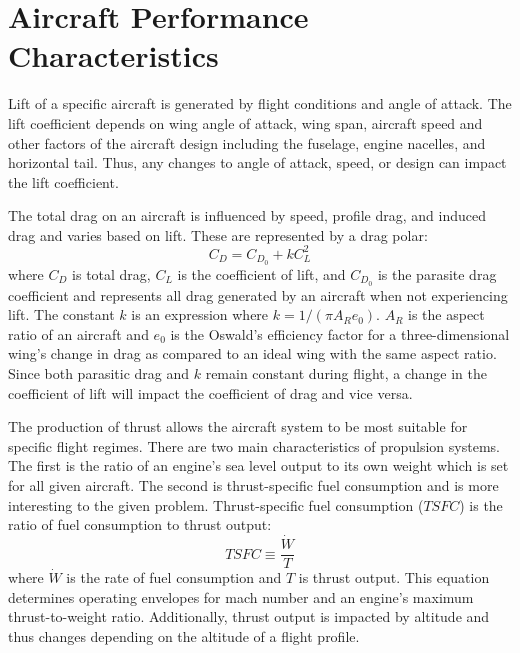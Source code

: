 \section{Aircraft Performance Characteristics}
Lift of a specific aircraft is generated by flight conditions and angle of attack. The lift coefficient depends on wing angle of attack, wing span, aircraft speed and other factors of the aircraft design including the fuselage, engine nacelles, and horizontal tail. Thus, any changes to angle of attack, speed, or design can impact the lift coefficient. \par
The total drag on an aircraft is influenced by speed, profile drag, and induced drag and varies based on lift. These are represented by a drag polar:
\begin{equation*}
    C_D = C_{D_0} + kC_L^2
\end{equation*}
where $C_D$ is total drag, $C_L$ is the coefficient of lift, and $C_{D_0}$ is the parasite drag coefficient and represents all drag generated by an aircraft when not experiencing lift. The constant $k$ is an expression where $k = 1/(\pi A_R e_0)$. $A_R$ is the aspect ratio of an aircraft and $e_0$ is the Oswald's efficiency factor for a three-dimensional wing's change in drag as compared to an ideal wing with the same aspect ratio. Since both parasitic drag and $k$ remain constant during flight, a change in the coefficient of lift will impact the coefficient of drag and vice versa.\par
The production of thrust allows the aircraft system to be most suitable for specific flight regimes. There are two main characteristics of propulsion systems. The first is the ratio of an engine's sea level output to its own weight which is set for all given aircraft. The second is thrust-specific fuel consumption and is more interesting to the given problem. Thrust-specific fuel consumption ($TSFC$) is the ratio of fuel consumption to thrust output:
\begin{equation*}
    TSFC\equiv \dfrac{\dot{W}}{T}
\end{equation*}
where $\dot{W}$ is the rate of fuel consumption and $T$ is thrust output. This equation determines operating envelopes for mach number and an engine's maximum thrust-to-weight ratio. Additionally, thrust output is impacted by altitude and thus changes depending on the altitude of a flight profile.
